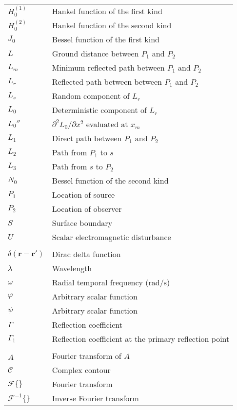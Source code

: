 \begin{supertabular}{ll}
$H_0^{(1)}$ & Hankel function of the first kind \\
$H_0^{(2)}$ & Hankel function of the second kind \\
$J_0$ & Bessel function of the first kind \\
$L$ & Ground distance between $P_1$ and $P_2$\\
$L_m$ & Minimum reflected path between $P_1$ and $P_2$\\
$L_r$ & Reflected path between between $P_1$ and $P_2$\\
$L_s$ & Random component of $L_r$\\
$L_0$ & Deterministic component of $L_r$\\
$L_0''$ & $\partial^2 L_0 /\partial x^2$ evaluated at $x_m$\\
$L_1$ & Direct path between $P_1$ and $P_2$\\
$L_2$ & Path from $P_1$ to $s$\\
$L_3$ & Path from $s$ to $P_2$\\
$N_0$ & Bessel function of the second kind \\
$P_1$ & Location of source\\
$P_2$ & Location of observer\\
$S$ & Surface boundary \\
$U$ & Scalar electromagnetic disturbance\\
\\
$\delta\left(\mathbf{r}-\mathbf{r}' \right)$ & Dirac delta function \\
$\lambda$ & Wavelength\\
$\omega$ & Radial temporal frequency (rad/s)\\
$\varphi$ & Arbitrary scalar function\\
$\psi$ & Arbitrary scalar function\\
$\Gamma$ & Reflection coefficient\\
$\Gamma_1$ & Reflection coefficient at the primary reflection point\\
\\
$\hat{A}$ & Fourier transform of $A$ \\
$\mathcal{C}$ & Complex contour \\
$\mathcal{F}\{\}$ & Fourier transform \\
$\mathcal{F}^{-1}\{\}$ & Inverse Fourier transform \\
\end{supertabular}